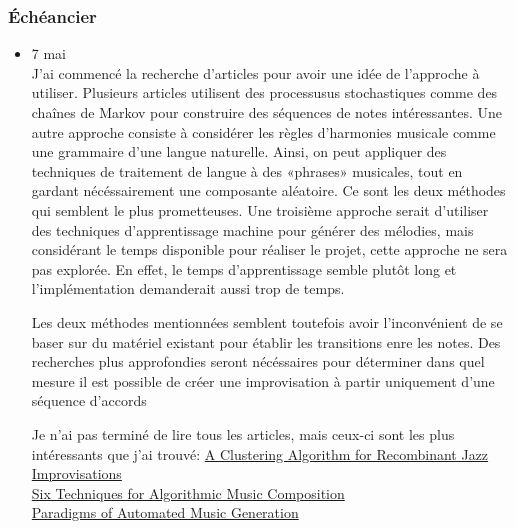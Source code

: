\documentclass[letterpaper,12pt]{scrartcl}
\begin{document}
	\subsubsection{Échéancier}
	\begin{itemize}
	\item 7 mai	\\
	J'ai commencé la recherche d'articles pour avoir une idée de l'approche à utiliser. Plusieurs articles utilisent des processusus stochastiques comme des chaînes de Markov pour construire des séquences de notes intéressantes. Une autre approche consiste à considérer les règles d'harmonies musicale comme une grammaire d'une langue naturelle. Ainsi, on peut appliquer des techniques de traitement de langue à des «phrases» musicales, tout en gardant nécéssairement une composante aléatoire. Ce sont les deux méthodes qui semblent le plus prometteuses. Une troisième approche serait d'utiliser des techniques d'apprentissage machine pour générer des mélodies, mais considérant le temps disponible pour réaliser le projet, cette approche ne sera pas explorée. En effet, le temps d'apprentissage semble plutôt long et l'implémentation demanderait aussi trop de temps. 

Les deux méthodes mentionnées semblent toutefois avoir l'inconvénient de se baser sur du matériel existant pour établir les transitions enre les notes. Des recherches plus approfondies seront nécéssaires pour déterminer dans quel mesure il est possible de créer une improvisation à partir uniquement d'une séquence d'accords 

Je n'ai pas terminé de lire tous les articles, mais ceux-ci sont les plus intéressants que j'ai trouvé:
\href{http://wesscholar.wesleyan.edu/cgi/viewcontent.cgi?article=1344&context=etd_hon_theses}{A Clustering Algorithm for Recombinant Jazz Improvisations}\\
\href{http://peterlangston.com/Papers/amc.pdf}{Six Techniques for Algorithmic Music Composition} \\
\href{https://books.google.ca/books?id=jaowAtnXsDQC&pg=PA118&lpg=PA118&dq=algorithmic+improvisation+grammar&source=bl&ots=GNMbfN7fZr&sig=VptvrQhvYNoqS1yv5XBOlrpY91M&hl=fr&sa=X&ved=0ahUKEwjL_b-qn9TTAhVr_4MKHe_wBBgQ6AEIOTAC#v=onepage&q=algorithmic\%20improvisation\%20grammar&f=false}{Paradigms of Automated Music Generation}\\


\end{itemize}
\end{document}
